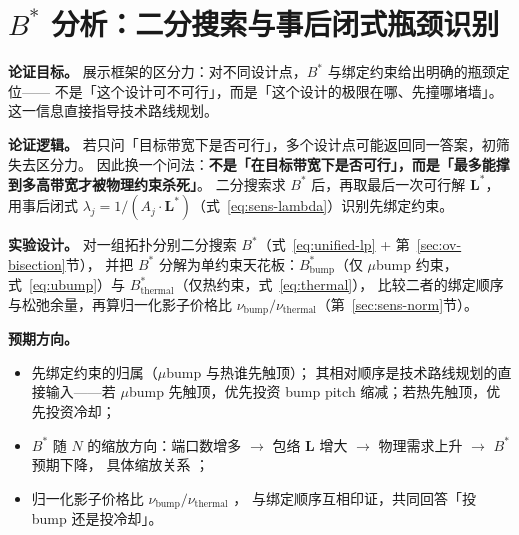 \section{$B^*$ 分析：二分搜索与事后闭式瓶颈识别}\label{sec:bmax}

\textbf{论证目标。}
展示框架的区分力：对不同设计点，$B^*$ 与绑定约束给出明确的瓶颈定位——
不是「这个设计可不可行」，而是「这个设计的极限在哪、先撞哪堵墙」。
这一信息直接指导技术路线规划。

\textbf{论证逻辑。}
若只问「目标带宽下是否可行」，多个设计点可能返回同一答案，初筛失去区分力。
因此换一个问法：\textbf{不是「在目标带宽下是否可行」，而是「最多能撑到多高带宽才被物理约束杀死」}。
二分搜索求 $B^*$ 后，再取最后一次可行解 $\mathbf{L}^*$，
用事后闭式 $\lambda_j = 1/(A_j\cdot\mathbf{L}^*)$（式~\eqref{eq:sens-lambda}）识别先绑定约束。

\textbf{实验设计。}
对一组拓扑分别二分搜索 $B^*$（式~\eqref{eq:unified-lp} + 第~\ref{sec:ov-bisection}节），
并把 $B^*$ 分解为单约束天花板：$B^*_{\text{bump}}$（仅 $\mu$bump 约束，式~\eqref{eq:ubump}）与
$B^*_{\text{thermal}}$（仅热约束，式~\eqref{eq:thermal}），
比较二者的绑定顺序与松弛余量，再算归一化影子价格比 $\nu_{\text{bump}}/\nu_{\text{thermal}}$（第~\ref{sec:sens-norm}节）。

\textbf{预期方向。}
\begin{itemize}
    \item 先绑定约束的归属（$\mu$bump 与热谁先触顶）；
    其相对顺序是技术路线规划的直接输入——若 $\mu$bump 先触顶，优先投资 bump pitch 缩减；若热先触顶，优先投资冷却；
    \item $B^*$ 随 $N$ 的缩放方向：端口数增多 $\to$ 包络 $\mathbf{L}$ 增大 $\to$ 物理需求上升 $\to$ $B^*$ 预期下降，
    具体缩放关系 ；
    \item 归一化影子价格比 $\nu_{\text{bump}}/\nu_{\text{thermal}}$ ，
    与绑定顺序互相印证，共同回答「投 bump 还是投冷却」。
\end{itemize}
